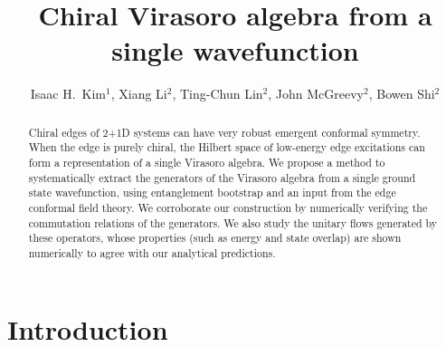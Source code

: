 \documentclass[12pt, nofootinbib]{article}
\theoremstyle{plain}
\theoremstyle{assumption}
\theoremstyle{definition}
\theoremstyle{plain}
\theoremstyle{plain}
\theoremstyle{plain}
\theoremstyle{plain}
\theoremstyle{plain}
\begin{document}
\title{Chiral Virasoro algebra from a single wavefunction}

\author{
Isaac H.~Kim${}^{1}$, Xiang Li${}^{2}$, Ting-Chun Lin${}^{2}$,
John McGreevy${}^{2}$, Bowen Shi${}^{2}$
}

\address{${}^{1}$Department of Computer Science, University of California, Davis, CA 95616, USA\\
${}^{2}$Department of Physics, University of California San Diego, La Jolla, CA 92093, USA}


\begin{abstract}
Chiral edges of 2+1D systems can have very robust emergent conformal symmetry. When the edge is purely chiral, the Hilbert space of low-energy edge excitations can form a representation of a single Virasoro algebra. We propose a method to systematically extract the generators of the Virasoro algebra from a single ground state wavefunction, using entanglement bootstrap and an input from the edge conformal field theory. We corroborate our construction by numerically verifying the commutation relations of the generators. We also study the unitary flows generated by these operators, whose properties (such as energy and state overlap) are shown numerically 
to agree with our analytical predictions. 
\end{abstract}

\vfill

\eject


\setcounter{tocdepth}{2}    %

\renewcommand{\baselinestretch}{0.75}\normalsize
\tableofcontents
\renewcommand{\baselinestretch}{1.1}\normalsize

\vfill\eject

 
 


\newpage 
\section{Introduction}
\label{sec:introduction}
\end{document}
